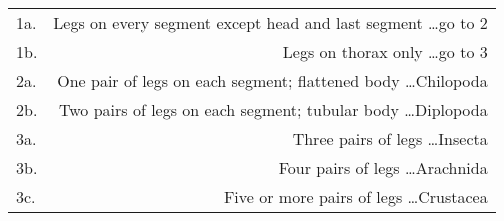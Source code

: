 \documentclass[12pt, varwidth, border=5mm]{standalone}
\begin{document}
\begin{tabular}{lr}
1a. & Legs on every segment except head and last segment \dots \dotfill go to 2 \\
1b. & Legs on thorax only \dots \dotfill go to 3 \\ 
2a. & One pair of legs on each segment; flattened body \dots \dotfill Chilopoda \\
2b. & Two pairs of legs on each segment; tubular body \dots \dotfill Diplopoda \\
3a. & Three pairs of legs \dots \dotfill Insecta \\
3b. & Four pairs of legs \dots \dotfill Arachnida \\
3c. & Five or more pairs of legs \dots \dotfill Crustacea \\
\end{tabular}
\end{document}
